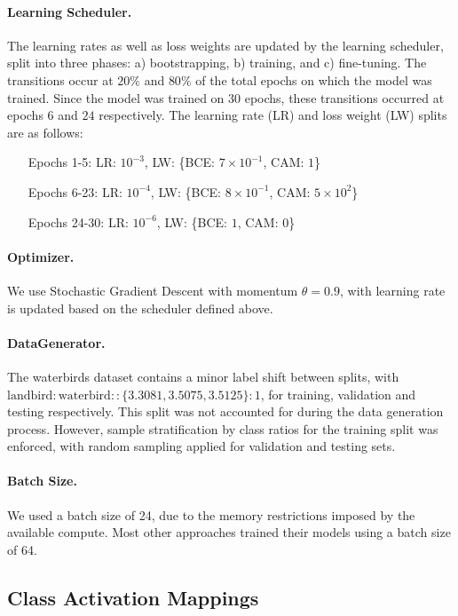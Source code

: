 \documentclass{article} %
\begin{document}
\paragraph{Learning Scheduler.} The learning rates as well as loss weights are updated by the learning scheduler, split into three phases: a) bootstrapping, b) training, and c) fine-tuning. The transitions occur at $20\%$ and $80\%$ of the total epochs on which the model was trained. Since the model was trained on 30 epochs, these transitions occurred at epochs $6$ and $24$ respectively. The learning rate (LR) and loss weight (LW) splits are as follows:
\begin{itemize}
	\item[Epochs 1-5:] LR: $10^{-3}$, LW: \{BCE: $7 \times 10^{-1}$, CAM: $1$\}
	\item[Epochs 6-23:] LR: $10^{-4}$, LW: \{BCE: $8 \times 10^{-1}$, CAM: $5 \times 10^2$\}
	\item[Epochs 24-30:] LR: $10^{-6}$, LW: \{BCE: $1$, CAM: $0$\} 
\end{itemize}

\paragraph{Optimizer.} We use Stochastic Gradient Descent with momentum $\theta = 0.9$, with learning rate is updated based on the scheduler defined above.

\paragraph{DataGenerator.} The waterbirds dataset contains a minor label shift between splits, with $\text{landbird}:\text{waterbird} :: \{3.3081, 3.5075, 3.5125\}:1$, for training, validation and testing respectively. This split was not accounted for during the data generation process. However, sample stratification by class ratios for the training split was enforced, with random sampling applied for validation and testing sets.

\paragraph{Batch Size.} We used a batch size of 24, due to the memory restrictions imposed by the available compute. Most other approaches \citep{liu2021just} trained their models using a batch size of 64.

\subsection{Class Activation Mappings}
\label{cam}
\end{document}
